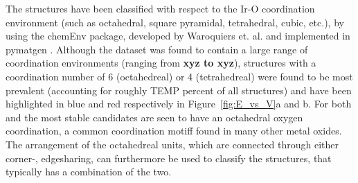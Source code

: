 %
The structures have been classified with respect to the Ir-O coordination environment
(such as octahedral, square pyramidal, tetrahedral, cubic, etc.),
by using the chemEnv package, developed by Waroquiers et. al. \cite{Waroquiers2017} and implemented in pymatgen \cite{Ong2013}.
%
Although the dataset was found to contain a large range of coordination environments (ranging from \textbf{xyz to xyz}),
structures with a coordination number of 6 (octahedreal) or 4 (tetrahedreal) were found to be most prevalent
(accounting for roughly TEMP percent of all structures)
and have been highlighted in blue and red respectively in Figure~\ref{fig:E_vs_V}a and b.
%
For both \IrOtwo and \IrOthree the most stable candidates are seen to have an octahedral oxygen coordination,
a common coordination motiff found in many other metal oxides.\cite{Waroquiers2017}
%
The arrangement of the octahedreal units, which are connected through either corner-, edgesharing,
can furthermore be used to classify the structures, that typically has a combination of the two.


